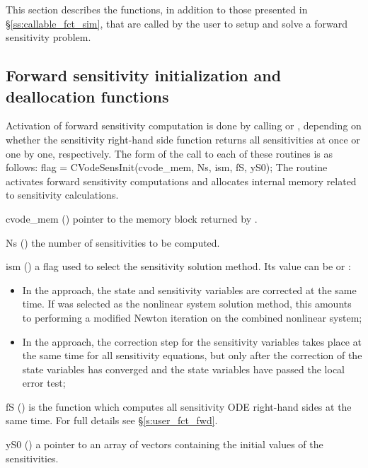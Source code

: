 This section describes the {\cvodes} functions, in addition to those presented
in \S\ref{ss:callable_fct_sim}, that are called by the user to setup and solve
a forward sensitivity problem.

\subsection{Forward sensitivity initialization and deallocation functions}
\label{ss:sensi_malloc}
Activation of forward sensitivity computation is done by calling
 or , depending on whether the sensitivity
right-hand side function returns all sensitivities at once or one by one, respectively.
The form of the call to each of these routines is as follows:
{
  flag = CVodeSensInit(cvode\_mem, Ns, ism, fS, yS0);
}
{
  The routine  activates forward sensitivity computations and
  allocates internal memory related to sensitivity calculations.
}
{
  \begin{args}

  \item[cvode\_mem] ()
    pointer to the {\cvodes} memory block returned by .

  \item[Ns] () 
    the number of sensitivities to be computed.

  \item[ism] ()
    a flag used to select the sensitivity solution method.  Its value can be
     or :
    \begin{itemize}
    \item In the  approach, the state and sensitivity variables are
      corrected at the same time. If  was selected as the nonlinear system 
      solution method, this amounts to performing a modified Newton iteration on the
      combined nonlinear system;
    \item In the  approach, the correction step for the sensitivity
      variables takes place at the same time for all sensitivity equations, but only after 
      the correction of the state variables has converged and the state variables 
      have passed the local error test; 
    \end{itemize}

  \item[fS] ()
    is the {\C} function which computes all sensitivity ODE right-hand sides at the same time.
    For full details see \S\ref{s:user_fct_fwd}.

  \item[yS0] () 
    a pointer to an array of  vectors containing the initial 
    values of the sensitivities.

  \end{args}
}
